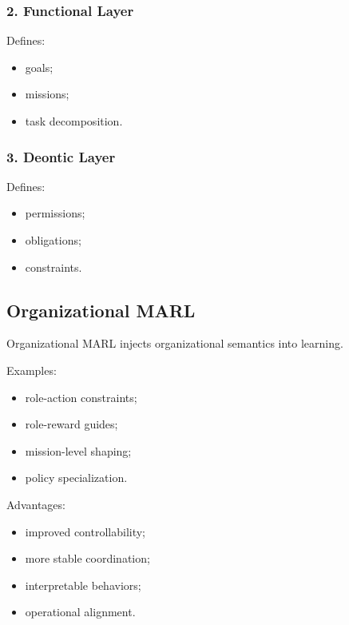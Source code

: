 \documentclass[10pt,a4paper,twocolumn]{article}
\begin{document}
\subsubsection*{2. Functional Layer}

Defines:
\begin{itemize}
    \item goals;
    \item missions;
    \item task decomposition.
\end{itemize}


\subsubsection*{3. Deontic Layer}

Defines:
\begin{itemize}
    \item permissions;
    \item obligations;
    \item constraints.
\end{itemize}


\subsection{Organizational MARL}

Organizational MARL injects organizational semantics into learning.

Examples:
\begin{itemize}
    \item role-action constraints;
    \item role-reward guides;
    \item mission-level shaping;
    \item policy specialization.
\end{itemize}

Advantages:
\begin{itemize}
    \item improved controllability;
    \item more stable coordination;
    \item interpretable behaviors;
    \item operational alignment.
\end{itemize}
\end{document}
